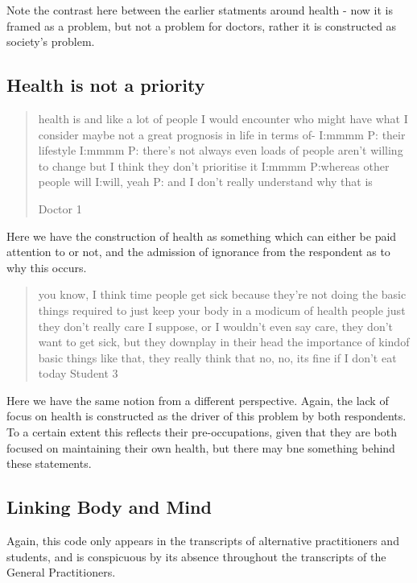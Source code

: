 Note the contrast here between the earlier statments around health - now it is framed as a problem, but not a problem for doctors, rather it is constructed as society's problem. 


\subsection{Health is not a priority}
\label{sec:health-not-priority}

\begin{quotation}
  health is and like a lot of people I would encounter who might have what I consider maybe not a great prognosis in life in terms of-
I:mmmm
P: their lifestyle 
I:mmmm
P: there's not always even loads of people aren't willing to change but I think they don't prioritise it 
I:mmmm
P:whereas other people will 
I:will, yeah
P: and I don't really understand why that is 

Doctor 1
\end{quotation}
Here we have the construction of health as something which can either be paid attention to or not, and the admission of ignorance from the respondent as to why this occurs. 

\begin{quotation}
  you know, I think time people get sick because they're not doing the basic things required to just keep your body in a modicum of health people just they don't really care I suppose, or I wouldn't even say care, they don't want to get sick, but they downplay in their head the importance of kindof basic things like that, they really think that no, no, its fine if I don't eat today
Student 3
\end{quotation}


Here we have the same notion from a different perspective. Again, the lack of focus on health is constructed as the driver of this problem by both respondents. To a certain extent this reflects their pre-occupations, given that they are both focused on maintaining their own health, but there may bne something behind these statements. 

\subsection{Linking Body and Mind}

Again, this code only appears in the transcripts of alternative practitioners and students, and is conspicuous by its absence throughout the transcripts of the General Practitioners. 

